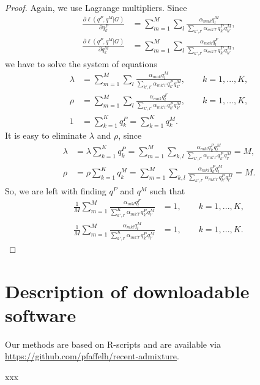 \documentclass[12pt]{article}
\theoremstyle{definition}
\begin{document}
\begin{proof}
  Again, we use Lagrange multipliers. Since
  \begin{align*}
    \frac{\partial \ell(q^P, q^M|G)}{\partial q^P_k}
    & = \sum_{m=1}^M \sum_l \frac{\alpha_{mak}q_l^M}{\sum_{k',l'} \alpha_{mk'l'}q^P_{k'}q^M_{k'}},
    \\
    \frac{\partial \ell(q^P, q^M|G)}{\partial q^M_k}
    & = \sum_{m=1}^M \sum_l \frac{\alpha_{mak}q_l^F}{\sum_{k',l'} \alpha_{mk'l'}q^P_{k'}q^M_{k'}},
  \end{align*}
  we have to solve the system of equations
  \begin{align}\label{eq:1}
    \lambda & = \sum_{m=1}^M \sum_l \frac{\alpha_{mak}q_l^M}{\sum_{k',l'} \alpha_{mk'l'}q^P_{k'}q^M_{k'}}, \qquad k=1,...,K,\\
    \rho & = \sum_{m=1}^M \sum_l \frac{\alpha_{mak}q_l^F}{\sum_{k',l'} \alpha_{mk'l'}q^P_{k'}q^M_{k'}}, \qquad k=1,...,K,
    \\\label{eq:2}
    1 & = \sum_{k=1}^K q^P_k = \sum_{k=1}^K q^M_k.
  \end{align}
  It is easy to eliminate $\lambda$ and $\rho$, since
  \begin{align*}
    \lambda & = \lambda \sum_{k=1}^K q^P_k = \sum_{m=1}^M \sum_{k,l}
              \frac{\alpha_{mkl}q^P_kq_l^M}{\sum_{k',l'} \alpha_{mk'l'}q^P_{k'}q_{l'}^M} = M,
    \\
    \rho & = \rho \sum_{k=1}^K q_k^M = \sum_{m=1}^M \sum_{k,l}
           \frac{\alpha_{mkl}q^P_kq_l^M}{\sum_{k',l'} \alpha_{mk'l'}q^P_{k'}q_{l'}^M} = M.    
  \end{align*}
  So, we are left with finding $q^P$ and $q^M$ such that
  \begin{align}\label{eq:1}
    \frac{1}{M}\sum_{m=1}^M \frac{\alpha_{mkl}q_l^F}{\sum_{k',l'}^K \alpha_{mk'l'}q^P_{k'} q^M_{l'}} & = 1, \qquad k=1,...,K,
    \\ \frac{1}{M}\sum_{m=1}^M \frac{\alpha_{mkl}q_l^M}{\sum_{k',l'}^K \alpha_{mk'l'}q^P_{k'} q^M_{l'}} & = 1, \qquad k=1,...,K.
  \end{align}
\end{proof}

\section{Description of downloadable software}
Our methods are based on R-scripts and are available via \url{
  https://github.com/pfaffelh/recent-admixture}.

xxx
\end{document}
